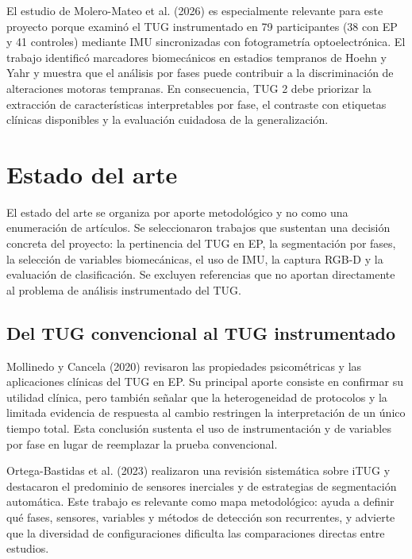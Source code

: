 \documentclass[12pt,a4paper]{article}
\begin{document}
El estudio de Molero-Mateo et al. (2026) es especialmente relevante para este proyecto porque examinó el TUG instrumentado en 79 participantes (38 con EP y 41 controles) mediante IMU sincronizadas con fotogrametría optoelectrónica. El trabajo identificó marcadores biomecánicos en estadios tempranos de Hoehn y Yahr y muestra que el análisis por fases puede contribuir a la discriminación de alteraciones motoras tempranas. En consecuencia, TUG 2 debe priorizar la extracción de características interpretables por fase, el contraste con etiquetas clínicas disponibles y la evaluación cuidadosa de la generalización.

\section{Estado del arte}\label{sec:estado-arte}

El estado del arte se organiza por aporte metodológico y no como una enumeración de artículos. Se seleccionaron trabajos que sustentan una decisión concreta del proyecto: la pertinencia del TUG en EP, la segmentación por fases, la selección de variables biomecánicas, el uso de IMU, la captura RGB-D y la evaluación de clasificación. Se excluyen referencias que no aportan directamente al problema de análisis instrumentado del TUG.

\subsection{Del TUG convencional al TUG instrumentado}\label{sec:ea-tug}

Mollinedo y Cancela (2020) revisaron las propiedades psicométricas y las aplicaciones clínicas del TUG en EP. Su principal aporte consiste en confirmar su utilidad clínica, pero también señalar que la heterogeneidad de protocolos y la limitada evidencia de respuesta al cambio restringen la interpretación de un único tiempo total. Esta conclusión sustenta el uso de instrumentación y de variables por fase en lugar de reemplazar la prueba convencional.

Ortega-Bastidas et al. (2023) realizaron una revisión sistemática sobre iTUG y destacaron el predominio de sensores inerciales y de estrategias de segmentación automática. Este trabajo es relevante como mapa metodológico: ayuda a definir qué fases, sensores, variables y métodos de detección son recurrentes, y advierte que la diversidad de configuraciones dificulta las comparaciones directas entre estudios.
\end{document}
